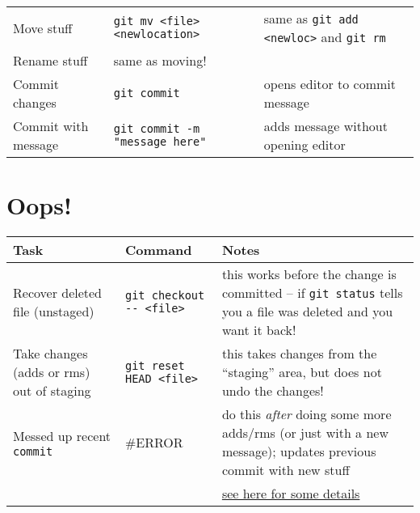 \documentclass[]{article}
\begin{document}
\begin{center}
\begin{tabular}{llp{2.5in}}
 Move stuff           &  \texttt{git mv <file> <newlocation>}            &  same as \texttt{git add <newloc>} and \texttt{git rm}                          \\
 Rename stuff         &  same as moving!                                 &                                                                                 \\
 Commit changes       &  \texttt{git commit}                             &  opens editor to commit message                                                 \\
 Commit with message  &  \texttt{git commit -m} \texttt{"message here"}  &  adds message without opening editor                                            \\
\end{tabular}
\end{center}
\section*{Oops!}
\label{sec-2}


\begin{center}
\begin{tabular}{llp{2.5in}}
 Task                                       &  Command                            &  Notes                                                                                                                   \\
\hline
 Recover deleted file (unstaged)            &  \texttt{git checkout -{}- <file>}  &  this works before the change is committed -- if \texttt{git status} tells you a file was deleted and you want it back!  \\
 Take changes (adds or rms) out of staging  &  \texttt{git reset HEAD <file>}     &  this takes changes from the ``staging'' area, but does not undo the changes!                                            \\
 Messed up recent \texttt{commit}           &  \#ERROR                            &  do this \emph{after} doing some more adds/rms (or just with a new message); updates previous commit with new stuff      \\
                                            &                                     &  \href{http://git-scm.com/book/en/Git-Basics-Undoing-Things}{see here for some details}                                  \\
\end{tabular}
\end{center}
\end{document}
